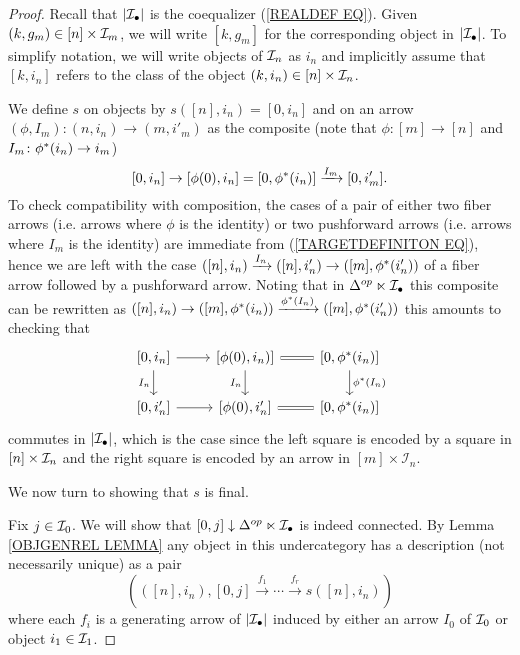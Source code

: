 \documentclass[a4paper,10pt]{article}%
\begin{document}
\begin{proof}
Recall that $|\mathcal{I}_{\bullet}|$ is the coequalizer (\ref{REALDEF EQ}). Given $(k,g_m) \in [n] \times \mathcal{I}_m$, we will write 
$[k,g_m]$ for the corresponding object in $|\mathcal{I}_{\bullet}|$.
To simplify notation, we will write objects of $\mathcal{I}_n$ as $i_n$
and implicitly assume that $[k,i_n]$ refers to the class of the object $(k,i_n) \in [n] \times \mathcal{I}_n$.


We define $s$ on objects by 
$s([n],i_n)=[0,i_n]$ and on an arrow 
$(\phi,I_m)\colon (n,i_n) \to (m,i'_m)$ as the composite
(note that $\phi\colon [m] \to [n]$ and $I_m\colon \phi^{\**}(i_n)\to i_m$)
\begin{equation}\label{TARGETDEFINITON EQ}
	[0,i_n] \to [\phi(0),i_n] =
	[0,\phi^{\**}(i_n)]	
	 \xrightarrow{I_m} 
	[0,i'_m].
\end{equation}
To check compatibility with composition,
the cases of a pair of either two fiber arrows (i.e. arrows where $\phi$ is the identity) or two pushforward arrows (i.e. arrows where $I_m$ is the identity) are immediate from (\ref{TARGETDEFINITON EQ}), 
hence we are left with the case 
$([n],i_n) \xrightarrow{I_n} ([n],i'_n) \to 
([m],\phi^{\**}(i'_n))$
 of a fiber arrow followed by a pushforward arrow. 
 Noting that in $\Delta^{op} \ltimes \mathcal{I}_{\bullet}$
this composite can be rewritten as
$([n],i_n) \to ([m],\phi^{\**}(i_n))
\xrightarrow{\phi^{\**}(I_n)} 
([m],\phi^{\**}(i'_n))$
 this amounts to checking that
\begin{equation}
\begin{tikzcd}
\left[0,i_n\right] \ar{r} \ar{d}[swap]{I_n} &
\left[\phi(0),i_n) \right] \ar[equal]{r} \ar{d}[swap]{I_n} &
\left[0,\phi^{\**}(i_n) \right] \ar{d}{\phi^{\**}(I_n)}
	\\
\left[0,i'_n\right] \ar{r} &
\left[\phi(0),i'_n\right] \ar[equal]{r} &
\left[0,\phi^{\**}(i_n)\right]
\end{tikzcd}
\end{equation}
commutes in $|\mathcal{I}_{\bullet}|$,
which is the case since the left square is encoded by a square in $[n]\times \mathcal{I}_n$
and the right square is encoded by an arrow in $[m]\times \mathcal{I}_n$.

We now turn to showing that $s$ is final.

Fix $j \in \mathcal{I}_0$. We will show that 
$[0,j] \downarrow \Delta^{op} \ltimes \mathcal{I}_{\bullet}$ is indeed connected.
By Lemma \ref{OBJGENREL LEMMA} any object 
 in this undercategory has a description (not necessarily unique) as a pair
\[\left(\left([n],i_n\right), [0,j] \xrightarrow{f_1} \cdots \xrightarrow{f_r} s([n],i_n) \right)\]
where each $f_i$ is a generating arrow of $|\mathcal{I}_{\bullet}|$
induced by either an arrow $I_0$ of $\mathcal{I}_0$ or object $i_1\in \mathcal{I}_1$.


\end{proof}
\end{document}
